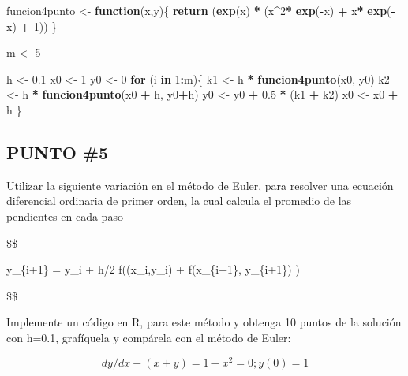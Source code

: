 \documentclass[]{article}
\newenvironment{Shaded}{\begin{snugshade}}{\end{snugshade}}
\newcommand{\KeywordTok}[1]{\textcolor[rgb]{0.13,0.29,0.53}{\textbf{#1}}}
\newcommand{\DecValTok}[1]{\textcolor[rgb]{0.00,0.00,0.81}{#1}}
\newcommand{\FloatTok}[1]{\textcolor[rgb]{0.00,0.00,0.81}{#1}}
\newcommand{\StringTok}[1]{\textcolor[rgb]{0.31,0.60,0.02}{#1}}
\newcommand{\ControlFlowTok}[1]{\textcolor[rgb]{0.13,0.29,0.53}{\textbf{#1}}}
\newcommand{\OperatorTok}[1]{\textcolor[rgb]{0.81,0.36,0.00}{\textbf{#1}}}
\newcommand{\NormalTok}[1]{#1}
\begin{document}
\begin{Shaded}
\begin{Highlighting}[]
\NormalTok{funcion4punto <-}\StringTok{ }\ControlFlowTok{function}\NormalTok{(x,y)\{}
  \KeywordTok{return}\NormalTok{  (}\KeywordTok{exp}\NormalTok{(x) }\OperatorTok{*}\StringTok{ }\NormalTok{(x}\OperatorTok{^}\DecValTok{2}\OperatorTok{*}\StringTok{ }\KeywordTok{exp}\NormalTok{(}\OperatorTok{-}\NormalTok{x) }\OperatorTok{+}\StringTok{ }\NormalTok{x}\OperatorTok{*}\StringTok{ }\KeywordTok{exp}\NormalTok{(}\OperatorTok{-}\NormalTok{x) }\OperatorTok{+}\StringTok{ }\DecValTok{1}\NormalTok{))}
\NormalTok{\}}

\NormalTok{m <-}\StringTok{ }\DecValTok{5}
  
\NormalTok{h <-}\StringTok{ }\FloatTok{0.1}
\NormalTok{ x0 <-}\StringTok{ }\DecValTok{1}
\NormalTok{ y0 <-}\StringTok{ }\DecValTok{0}
\ControlFlowTok{for}\NormalTok{ (i  }\ControlFlowTok{in} \DecValTok{1}\OperatorTok{:}\NormalTok{m)\{}
\NormalTok{  k1 <-}\StringTok{ }\NormalTok{h }\OperatorTok{*}\StringTok{ }\KeywordTok{funcion4punto}\NormalTok{(x0, y0)}
\NormalTok{  k2 <-}\StringTok{ }\NormalTok{h }\OperatorTok{*}\StringTok{ }\KeywordTok{funcion4punto}\NormalTok{(x0 }\OperatorTok{+}\StringTok{ }\NormalTok{h, y0}\OperatorTok{+}\NormalTok{h)}
\NormalTok{  y0 <-}\StringTok{ }\NormalTok{y0 }\OperatorTok{+}\StringTok{ }\FloatTok{0.5} \OperatorTok{*}\StringTok{ }\NormalTok{(k1 }\OperatorTok{+}\StringTok{ }\NormalTok{k2)}
\NormalTok{  x0 <-}\StringTok{ }\NormalTok{x0 }\OperatorTok{+}\StringTok{ }\NormalTok{h}
\NormalTok{ \}}
\end{Highlighting}
\end{Shaded}

\subsection{PUNTO \#5}\label{punto-5}

Utilizar la siguiente variación en el método de Euler, para resolver una
ecuación diferencial ordinaria de primer orden, la cual calcula el
promedio de las pendientes en cada paso

\$\$

y\_\{i+1\} = y\_i + h/2 f((x\_i,y\_i) + f(x\_\{i+1\}, y\_\{i+1\}) )

\$\$

Implemente un código en R, para este método y obtenga 10 puntos de la
solución con h=0.1, grafíquela y compárela con el método de Euler:

\[
    dy/dx - (x+y) = 1 - x^2 =0 ; y(0) =1 
\]
\end{document}
